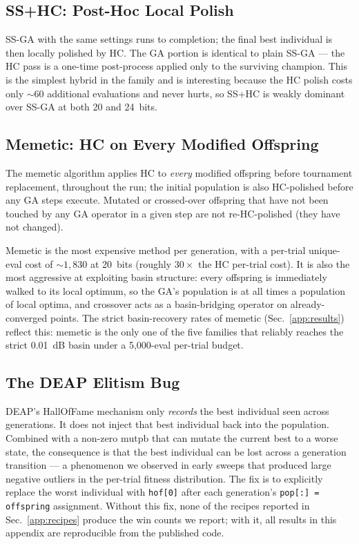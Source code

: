 \subsection{SS+HC: Post-Hoc Local Polish}

SS-GA with the same settings runs to completion; the final best
individual is then locally polished by HC. The GA portion is
identical to plain SS-GA --- the HC pass is a one-time post-process
applied only to the surviving champion. This is the simplest hybrid
in the family and is interesting because the HC polish costs only
$\sim\!60$ additional evaluations and never hurts, so SS+HC is
weakly dominant over SS-GA at both 20 and 24~bits.

\subsection{Memetic: HC on Every Modified Offspring}

The memetic algorithm \cite{Moscato1989Memetic} applies HC to
\emph{every} modified offspring before tournament replacement,
throughout the run; the initial population is also HC-polished
before any GA steps execute. Mutated or crossed-over offspring
that have not been touched by any GA operator in a given step are
not re-HC-polished (they have not changed).

Memetic is the most expensive method per generation, with a
per-trial unique-eval cost of $\sim\!1{,}830$ at 20~bits (roughly
$30\times$ the HC per-trial cost). It is also the most aggressive
at exploiting basin structure: every offspring is immediately
walked to its local optimum, so the GA's population is at all
times a population of local optima, and crossover acts as a
basin-bridging operator on already-converged points. The strict
basin-recovery rates of memetic (Sec.~\ref{app:results}) reflect
this: memetic is the only one of the five families that reliably
reaches the strict 0.01~dB basin under a 5{,}000-eval per-trial
budget.

\subsection{The DEAP Elitism Bug}
\label{app:methods:deap_bug}

DEAP's HallOfFame mechanism only \emph{records} the best individual
seen across generations. It does not inject that best individual
back into the population. Combined with a non-zero $\mathrm{mutpb}$
that can mutate the current best to a worse state, the consequence
is that the best individual can be lost across a generation
transition --- a phenomenon we observed in early sweeps that
produced large negative outliers in the per-trial fitness
distribution. The fix is to explicitly replace the worst
individual with \texttt{hof[0]} after each generation's
\texttt{pop[:] = offspring} assignment. Without this fix, none of
the recipes reported in Sec.~\ref{app:recipes} produce the win
counts we report; with it, all results in this appendix are
reproducible from the published code.


